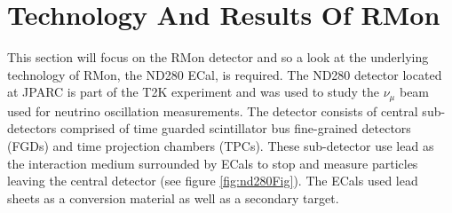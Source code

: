 \section{Technology And Results Of RMon}
This section will focus on the RMon detector and so a look at the underlying technology of RMon, the ND280 ECal, is required. The ND280 detector located at JPARC is part of the T2K experiment and was used to study the $\nu_\mu$ beam used for neutrino oscillation measurements. The detector consists of central sub-detectors comprised of time guarded scintillator bus fine-grained detectors (FGDs) and time projection chambers (TPCs). These sub-detector use lead as the interaction medium surrounded by ECals to stop and measure particles leaving the central detector (see figure \ref{fig:nd280Fig}). The ECals used lead sheets as a conversion material as well as a secondary target. 


